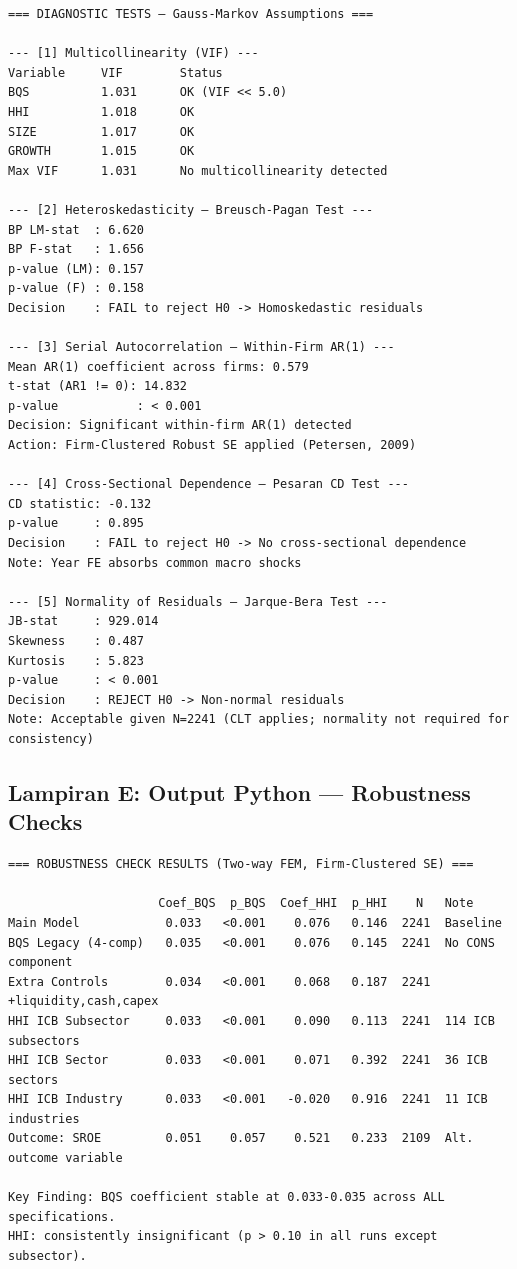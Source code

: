 \documentclass[12pt,a4paper]{article}
\begin{document}
\begin{small}
\begin{verbatim}
=== DIAGNOSTIC TESTS — Gauss-Markov Assumptions ===

--- [1] Multicollinearity (VIF) ---
Variable     VIF        Status
BQS          1.031      OK (VIF << 5.0)
HHI          1.018      OK
SIZE         1.017      OK
GROWTH       1.015      OK
Max VIF      1.031      No multicollinearity detected

--- [2] Heteroskedasticity — Breusch-Pagan Test ---
BP LM-stat  : 6.620
BP F-stat   : 1.656
p-value (LM): 0.157
p-value (F) : 0.158
Decision    : FAIL to reject H0 -> Homoskedastic residuals

--- [3] Serial Autocorrelation — Within-Firm AR(1) ---
Mean AR(1) coefficient across firms: 0.579
t-stat (AR1 != 0): 14.832
p-value           : < 0.001
Decision: Significant within-firm AR(1) detected
Action: Firm-Clustered Robust SE applied (Petersen, 2009)

--- [4] Cross-Sectional Dependence — Pesaran CD Test ---
CD statistic: -0.132
p-value     : 0.895
Decision    : FAIL to reject H0 -> No cross-sectional dependence
Note: Year FE absorbs common macro shocks

--- [5] Normality of Residuals — Jarque-Bera Test ---
JB-stat     : 929.014
Skewness    : 0.487
Kurtosis    : 5.823
p-value     : < 0.001
Decision    : REJECT H0 -> Non-normal residuals
Note: Acceptable given N=2241 (CLT applies; normality not required for consistency)
\end{verbatim}
\end{small}

\subsection{Lampiran E: Output Python --- Robustness
Checks}\label{lampiran-e-output-python-robustness-checks}

\begin{small}
\begin{verbatim}
=== ROBUSTNESS CHECK RESULTS (Two-way FEM, Firm-Clustered SE) ===

                     Coef_BQS  p_BQS  Coef_HHI  p_HHI    N   Note
Main Model            0.033   <0.001    0.076   0.146  2241  Baseline
BQS Legacy (4-comp)   0.035   <0.001    0.076   0.145  2241  No CONS component
Extra Controls        0.034   <0.001    0.068   0.187  2241  +liquidity,cash,capex
HHI ICB Subsector     0.033   <0.001    0.090   0.113  2241  114 ICB subsectors
HHI ICB Sector        0.033   <0.001    0.071   0.392  2241  36 ICB sectors
HHI ICB Industry      0.033   <0.001   -0.020   0.916  2241  11 ICB industries
Outcome: SROE         0.051    0.057    0.521   0.233  2109  Alt. outcome variable

Key Finding: BQS coefficient stable at 0.033-0.035 across ALL specifications.
HHI: consistently insignificant (p > 0.10 in all runs except subsector).
\end{verbatim}
\end{small}
\end{document}
